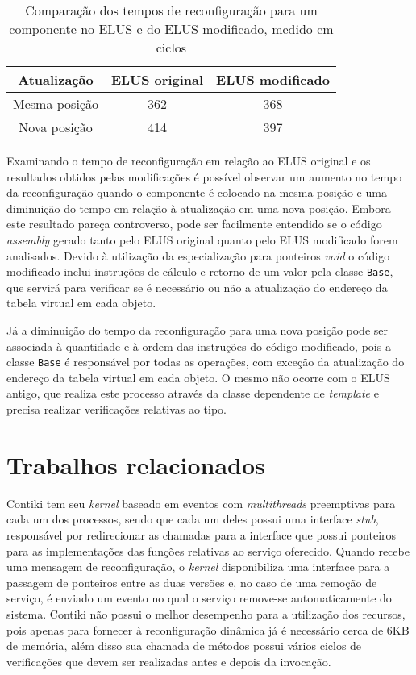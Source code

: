 \documentclass[12pt]{article}
\begin{document}
\begin{table}[!th]
\caption{Comparação dos tempos de reconfiguração para um componente no ELUS e do ELUS modificado, medido em ciclos}
\begin{center}
\begin{tabular}{|c|c|c|} \hline
\textbf{Atualização} & \textbf{ELUS original} & \textbf{ELUS modificado} \\ \hline
\multicolumn{1}{|c|}{Mesma posição} & 362 & 368 \\ \hline
\multicolumn{1}{|c|}{Nova posição}  & 414 & 397 \\ \hline
\end{tabular}
\end{center}
\label{tab:time}
\end{table}
 
Examinando o tempo de reconfiguração em relação ao ELUS original e os resultados obtidos pelas modificações é possível observar um aumento no tempo da reconfiguração quando o componente é colocado na mesma posição e uma diminuição do tempo em relação à atualização em uma nova posição. Embora este resultado pareça controverso, pode ser facilmente entendido se o código \textit{assembly} gerado tanto pelo ELUS original quanto pelo ELUS modificado forem analisados. Devido à utilização da especialização para ponteiros \textit{void} o código modificado inclui instruções de cálculo e retorno de um valor pela classe \texttt{Base}, que servirá para verificar se é necessário ou não a atualização do endereço da tabela virtual em cada objeto. 

Já a diminuição do tempo da reconfiguração para uma nova posição pode ser associada à quantidade e à ordem das instruções do código modificado, pois a classe \texttt{Base} é responsável por todas as operações, com exceção da atualização do endereço da tabela virtual em cada objeto. O mesmo não ocorre com o ELUS antigo, que realiza este processo através da classe dependente de \textit{template} e precisa realizar verificações relativas ao tipo.

\section{Trabalhos relacionados}
\label{sec:rel}
Contiki \cite{dunkels2004contiki} tem seu \textit{kernel} baseado em eventos com \textit{multithreads} preemptivas para cada um dos processos, sendo que cada um deles possui uma interface \textit{stub}, responsável por redirecionar as chamadas para a interface que possui ponteiros para as implementações das funções relativas ao serviço oferecido. Quando recebe uma mensagem de reconfiguração, o \textit{kernel} disponibiliza uma interface para a passagem de ponteiros entre as duas versões e, no caso de uma remoção de serviço, é enviado um evento no qual o serviço remove-se 
automaticamente do sistema. Contiki não possui o melhor desempenho para a utilização dos recursos, pois apenas para fornecer à reconfiguração dinâmica já é necessário cerca de  6KB de memória, além disso sua chamada de métodos possui vários ciclos de verificações que devem ser realizadas antes e depois da invocação.
\end{document}
